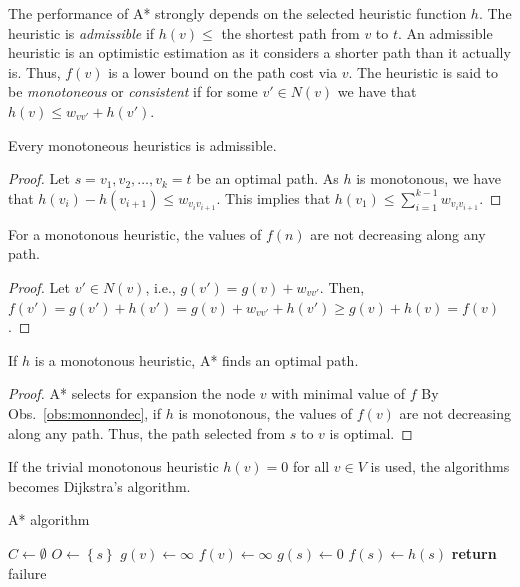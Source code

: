 The performance of A* strongly depends on the selected heuristic function $h$.
The heuristic is \emph{admissible} if $h(v)\leq$ the shortest path from $v$ to $t$.
An admissible heuristic is an optimistic estimation as it considers a shorter path than it actually is. 
Thus, $f(v)$ is a lower bound on the path cost via $v$.
The heuristic is said to be \emph{monotoneous} or \emph{consistent} if for some $v'\in N(v)$ we have that $h(v)\leq w_{vv'}+h(v')$.
\begin{observation}
Every monotoneous heuristics is admissible.
\end{observation}
\begin{proof}
Let $s=v_1,v_2,\dots,v_k=t$ be an optimal path.
As $h$ is monotonous, we have that $h(v_i)-h(v_{i+1})\leq w_{v_iv_{i+1}}$.
	This implies that $h(v_1)\leq\sum_{i=1}^{k-1}w_{v_iv_{i+1}}$.
\end{proof}
\begin{observation}
For a monotonous heuristic, the values of $f(n)$ are not decreasing along any path.
\end{observation}
\begin{proof}\label{obs:monnondec}
	Let $v'\in N(v)$, i.e., $g(v')=g(v)+w_{vv'}$.
Then, $f(v')=g(v')+h(v')=g(v)+w_{vv'}+h(v')\geq g(v)+h(v)=f(v)$.
\end{proof}
\begin{proposition}
If $h$ is a monotonous heuristic, A* finds an optimal path.
\end{proposition}
\begin{proof}
	A* selects for expansion the node $v$ with minimal value of $f$ 
	By Obs.~\ref{obs:monnondec}, if $h$ is monotonous, the values of $f(v)$ are not decreasing along any path.
	Thus, the path selected from $s$ to $v$ is optimal.
\end{proof}
If the trivial monotonous heuristic $h(v)=0$ for all $v\in V$ is used, the algorithms becomes Dijkstra's algorithm.

\begin{algorithm}
\DontPrintSemicolon
\SetAlgoLined
\caption{A* algorithm}
\BlankLine
{}
\BlankLine
$C\leftarrow\emptyset$\;
$O\leftarrow\left\{s\right\}$\;
 {
	$g(v)\leftarrow\infty$\;
	$f(v)\leftarrow\infty$\;
}
$g(s)\leftarrow 0$\;
$f(s)\leftarrow h(s)$\;
\textbf{return } failure
\label{alg:astar}
\end{algorithm}

